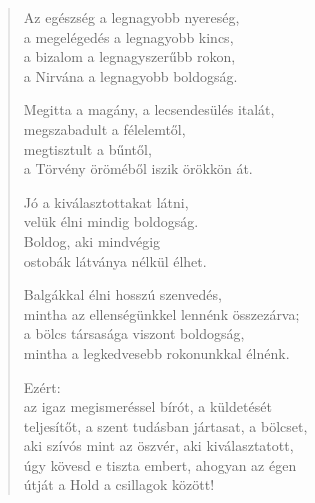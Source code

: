 \begin{verse}
 Az egészség a legnagyobb nyereség,\\
a megelégedés a legnagyobb kincs,\\
a bizalom a legnagyszerűbb rokon,\\
a Nirvána a legnagyobb boldogság.

 Megitta a magány, a lecsendesülés italát,\\
megszabadult a félelemtől,\\
megtisztult a bűntől,\\
a Törvény öröméből iszik örökkön át.

 Jó a kiválasztottakat látni,\\
velük élni mindig boldogság.\\
Boldog, aki mindvégig\\
ostobák látványa nélkül élhet.

 Balgákkal élni hosszú szenvedés,\\
mintha az ellenségünkkel lennénk összezárva;\\
a bölcs társasága viszont boldogság,\\
mintha a legkedvesebb rokonunkkal élnénk.

 Ezért:\\
az igaz megismeréssel bírót, a küldetését\\
teljesítőt, a szent tudásban jártasat, a bölcset,\\
aki szívós mint az öszvér, aki kiválasztatott,\\
úgy kövesd e tiszta embert, ahogyan az égen\\
útját a Hold a csillagok között!

\end{verse}
